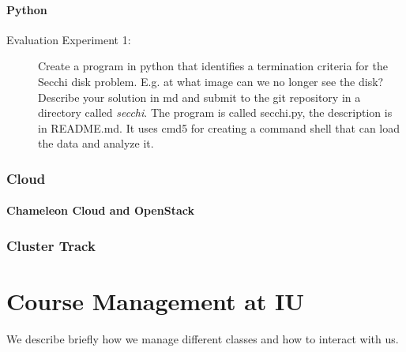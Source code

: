 \subsubsection{Python}




\begin{description}
\item[Evaluation Experiment 1:] Create a program in python that
  identifies a termination criteria for the Secchi disk
  problem. E.g. at what image can we no longer see the disk?
  Describe your solution in md and submit to the git repository in a
  directory called {\em secchi}. The program is called secchi.py, the
  description is in README.md. It uses cmd5 for creating a command
  shell that can load the data and analyze it. 
\end{description}

\subsection{Cloud}

\subsubsection{Chameleon Cloud and OpenStack}




\subsection{Cluster Track}



\chapter{Course Management at IU}

We describe briefly how we manage different classes and how to
interact with us. 


